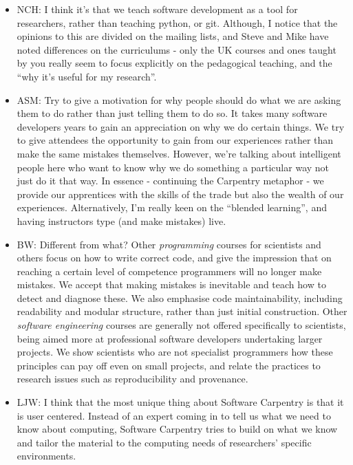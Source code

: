 \documentclass{article}
\begin{document}
\begin{itemize}
  \item NCH: I think it's that we teach software development as a tool
    for researchers, rather than teaching python, or git. Although, I
    notice that the opinions to this are divided on the mailing lists,
    and Steve and Mike have noted differences on the curriculums -
    only the UK courses and ones taught by you really seem to focus
    explicitly on the pedagogical teaching, and the ``why it's useful
    for my research''.

  \item ASM: Try to give a motivation for why people should do what we
    are asking them to do rather than just telling them to do so. It
    takes many software developers years to gain an appreciation on
    why we do certain things. We try to give attendees the opportunity
    to gain from our experiences rather than make the same mistakes
    themselves. However, we're talking about intelligent people here
    who want to know why we do something a particular way not just do
    it that way. In essence - continuing the Carpentry metaphor - we
    provide our apprentices with the skills of the trade but also the
    wealth of our experiences.  Alternatively, I'm really keen on the
    ``blended learning'', and having instructors type (and make
    mistakes) live.

  \item BW: Different from what? Other {\em programming} courses for
    scientists and others focus on how to write correct code,
    and give the impression that on reaching a certain level of competence
    programmers will no longer make mistakes. We accept that making
    mistakes is inevitable and teach how to detect and diagnose these.
    We also emphasise code maintainability, including readability and
    modular structure, rather than just initial construction.
    Other {\em software engineering} courses are generally not offered
    specifically to scientists, being aimed more at professional
    software developers undertaking larger projects. We show scientists
    who are not specialist programmers how these principles can pay off
    even on small projects, and relate the practices to research issues such as
    reproducibility and provenance.
    
  \item LJW: I think that the most unique thing about Software
    Carpentry is that it is user centered.  Instead of an expert
    coming in to tell us what we need to know about computing,
    Software Carpentry tries to build on what we know and tailor the
    material to the computing needs of researchers' specific
    environments.


\end{itemize}
\end{document}
